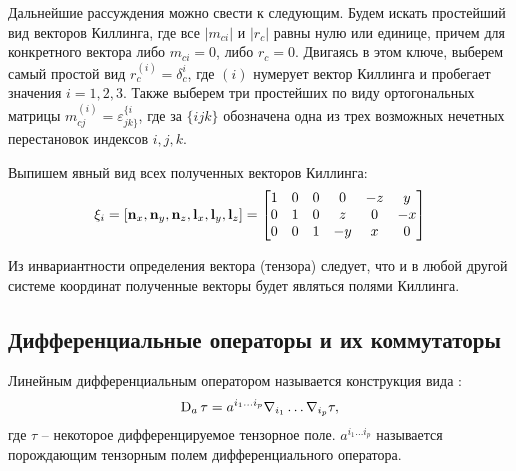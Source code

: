 \documentclass[12pt,a4paper]{article}
\begin{document}
            Дальнейшие рассуждения можно свести к следующим. Будем искать простейший вид векторов Киллинга, где все $|m_{ci}|$ и $|r_c|$ равны нулю или единице, причем для конкретного вектора либо $m_{ci} = 0$, либо $r_c = 0$. Двигаясь в этом ключе, выберем самый простой вид $r^{(i)}_c = \delta^i_c$, где $(i)$ нумерует вектор Киллинга и пробегает значения $i = 1,2,3$. Также выберем три простейших по виду ортогональных матрицы $m^{(i)}_{cj} = \varepsilon^{\{i}_{jk\}}$, где за $\{ijk\}$ обозначена одна из трех возможных нечетных перестановок индексов $i,j,k$.

            Выпишем явный вид всех полученных векторов Киллинга:
            \begin{equation}
                \mathbf{\xi}_i
                =
                \left[
                    \mathbf{n}_x, \mathbf{n}_y, \mathbf{n}_z,
                    \mathbf{l}_x, \mathbf{l}_y, \mathbf{l}_z
                \right]
                =
                \begin{bmatrix}
                    1 & 0 & 0 & 0  & -z & y  \\
                    0 & 1 & 0 & z  & 0  & -x \\
                    0 & 0 & 1 & -y & x  & 0
                \end{bmatrix}
            \end{equation}

            Из инвариантности определения вектора (тензора) следует, что и в любой другой системе координат полученные векторы будет являться полями Киллинга.


        \subsection{Дифференциальные операторы и их коммутаторы\label{sec:commutators}}

            Линейным дифференциальным оператором называется конструкция вида \cite{differential_operator_commutators}:
            \begin{equation}\label{eq:differential_operator}
                \operatorname{D}_a\tau = a^{i_1 \dots i_p} \nabla_{i_1} \dots \nabla_{i_p} \tau ,
            \end{equation}
            где $\tau$ -- некоторое дифференцируемое тензорное поле. $a^{i_1 \dots i_p}$ называется порождающим тензорным полем дифференциального оператора.
\end{document}
